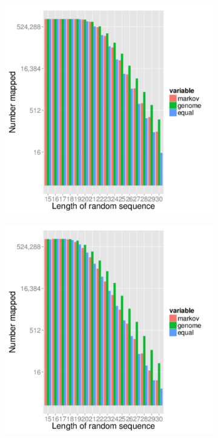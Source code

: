 \documentclass{article}
\begin{document}
\begin{figure}[t]
\begin{subfigure}{.5\textwidth}
      \caption{}
      \label{fig:mm10_mapped}
   \end{subfigure}
   \begin{subfigure}{.5\columnwidth}
      \centering
      \includegraphics[width=.9\textwidth,natwidth=100,natheight=100]{danRer7_mapped_1000000.pdf}
      \caption{}
      \label{fig:danRer7_mapped}
   \end{subfigure}%
   \begin{subfigure}{.5\columnwidth}
      \centering
      \includegraphics[width=.9\textwidth,natwidth=100,natheight=100]{ce10_mapped_1000000.pdf}
      \caption{}
      \label{fig:ce10_mapped}
   \end{subfigure}
   \caption{}
   \label{fig:mapped_statistic}
\end{figure}
\end{document}
